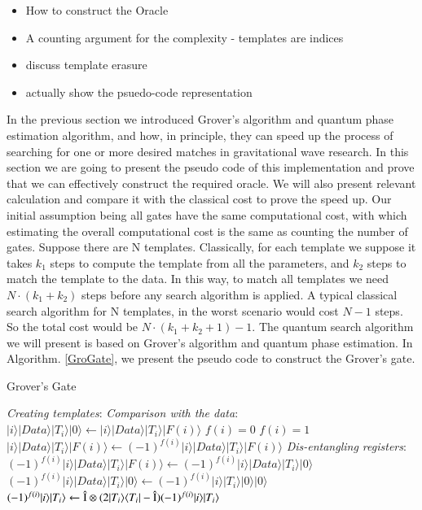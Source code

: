 \documentclass[aps,prd,nofootinbib,twocolumn,reprint,superscriptaddress,showpacs,showkeys,longbibliography]{revtex4-1}
\newcommand{\bra}[1]{\langle #1|}
\newcommand{\ket}[1]{|#1\rangle}
\begin{document}
\begin{itemize}
\item How to construct the Oracle
\item A counting argument for the complexity - templates are indices
\item discuss template erasure
\item actually show the psuedo-code representation
\end{itemize}
In the previous section we introduced Grover's algorithm and quantum phase estimation algorithm, and how, in principle, they can speed up the process of searching for one or more desired matches in gravitational wave research. In this section we are going to present the pseudo code of this implementation and prove that we can effectively construct the required oracle. We will also present relevant calculation and compare it with the classical cost to prove the speed up.
\newline \newline Our initial assumption being all gates have the same computational cost, with which estimating the overall computational cost is the same as counting the number of gates. Suppose there are N templates. Classically, for each template we suppose it takes $k_1$ steps to compute the template from all the parameters, and $k_2$ steps to match the template to the data. In this way, to match all templates we need $N \cdot (k_1+k_2)$ steps before any search algorithm is applied. A typical classical search algorithm for N templates, in the worst scenario would cost $N-1$ steps. So the total cost would be $N \cdot (k_1+k_2+1)-1$.
\newline \newline The quantum search algorithm we will present is based on Grover's algorithm and quantum phase estimation. In Algorithm. \ref{GroGate}, we present the pseudo code to construct the Grover's gate.
\begin{algorithm}[h]
\caption{Grover's Gate}\label{GroGate}
\begin{algorithmic}

\Function{Grover's Search algorithm}{N, $\ket{Data}$}
\label{GroverPseudo}
\State \emph{Creating templates}:
    \State{$ \ket{i}\ket{0} \gets \ket{i}\ket{T_i}$}
\EndFor
\State \emph{Comparison with the data}:
    \State$\ket{i}\ket{Data}\ket{T_i}\ket{0} \gets \ket{i}\ket{Data}\ket{T_i}\ket{F(i)}$
            \State $f(i)=0$
        \Else 
            \State $f(i)=1$
        \EndIf
\State $\ket{i}\ket{Data}\ket{T_i}\ket{F(i)} \gets (-1)^{f(i)}\ket{i}\ket{Data}\ket{T_i}\ket{F(i)} $
\State \emph{Dis-entangling registers}:
    \State $(-1)^{f(i)}\ket{i}\ket{Data}\ket{T_i}\ket{F(i)} \gets (-1)^{f(i)}\ket{i}\ket{Data}\ket{T_i}\ket{0}$
    \State $(-1)^{f(i)}\ket{i}\ket{Data}\ket{T_i}\ket{0}\gets (-1)^{f(i)}\ket{i}\ket{T_i}\ket{0}\ket{0}$
\EndProcedure
{}
\State $ (-1)^{f(i)}\ket{i}\ket{T_i}  \gets \hat{\rm I}\otimes(2\ket{T_i}\bra{T_i}-\hat{\rm I})(-1)^{f(i)}\ket{i}\ket{T_i}$
\EndProcedure
\EndFunction

\end{algorithmic}
\end{algorithm}
\end{document}
